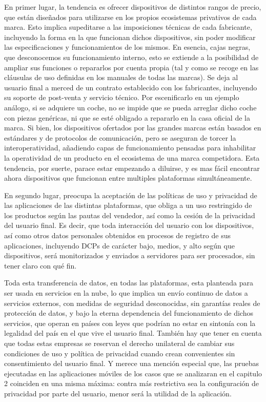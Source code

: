 En primer lugar, la tendencia es ofrecer dispositivos de distintos rangos de precio, que están diseñados para utilizarse en los propios ecosistemas privativos de cada marca. Esto implica supeditarse a las imposiciones técnicas de cada fabricante, incluyendo la forma en la que funcionan dichos dispositivos, sin poder modificar las especificaciones y funcionamientos de los mismos. En esencia, cajas negras, que desconocemos su funcionamiento interno, esto se extiende a la posibilidad de ampliar sus funciones o repararlos por cuenta propia (tal y como se recoge en las cláusulas de uso definidas en los manuales de todas las marcas). Se deja al usuario final a merced de un contrato establecido con los fabricantes, incluyendo su soporte de post-venta y servicio técnico. Por escenificarlo en un ejemplo análogo, si se adquiere un coche, no se impide que se pueda arreglar dicho coche con piezas genéricas, ni que se esté obligado a repararlo en la casa oficial de la marca. Si bien, los dispositivos ofertados por las grandes marcas están basados en estándares y de protocolos de comunicación, pero se aseguran de torcer la interoperatividad, añadiendo capas de funcionamiento pensadas para inhabilitar la operatividad de un producto en el ecosistema de una marca competidora. Esta tendencia, por suerte, parace estar empezando a diluirse, y es mas fácil encontrar ahora dispositivos que funcionan entre multiples plataformas simultáneamente.

\vspace{1cm}

En segundo lugar, preocupa la aceptación de las políticas de uso y privacidad de las aplicaciones de las distintas plataformas, que obliga a un uso restringido de los productos según las pautas del vendedor, así como la cesión de la privacidad del usuario final. Es decir, que toda interacción del usuario con los dispositivos, así como otros datos personales obtenidos en procesos de registro de sus aplicaciones, incluyendo DCPs de carácter bajo, medios, y alto según que dispositivos, será monitorizados y enviados a servidores para ser procesados, sin tener claro con qué fin.

\vspace{1cm}

Toda esta transferencia de datos, en todas las plataformas, esta planteada para ser usada en servicios en la nube, lo que implica un envío continuo de datos a servicios externos, con medidas de seguridad desconocidas, sin garantías reales de protección de datos, y bajo la eterna dependencia del funcionamiento de dichos servicios, que operan en países con leyes que podrían no estar en sintonía con la legalidad del país en el que vive el usuario final. También hay que tener en cuenta que todas estas empresas se reservan el derecho unilateral de cambiar sus condiciones de uso y política de privacidad cuando crean convenientes sin consentimiento del usuario final. Y merece una mención especial que, las pruebas ejecutadas en las aplicaciones móviles de los casos que se analizaran en el capitulo 2 coinciden en una misma máxima: contra más restrictiva sea la configuración de privacidad por parte del usuario, menor será la utilidad de la aplicación.

